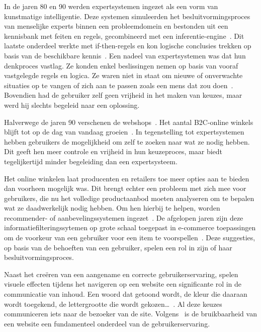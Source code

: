In de jaren 80 en 90 werden expertsystemen ingezet als een vorm van kunstmatige intelligentie. Deze systemen simuleerden het besluitvormingsproces van menselijke experts binnen een probleemdomein en bestonden uit een kennisbank met feiten en regels, gecombineerd met een inferentie-engine~\autocite{Angeli2010,Castillo2012}. Dit laatste onderdeel werkte met if-then-regels en kon logische conclusies trekken op basis van de beschikbare kennis~\autocite{Buchanan1988}. Een nadeel van expertsystemen was dat hun denkproces vastlag. Ze konden enkel beslissingen nemen op basis van vooraf vastgelegde regels en logica. Ze waren niet in staat om nieuwe of onverwachte situaties op te vangen of zich aan te passen zoals een mens dat zou doen~\autocite{Castillo2012}. Bovendien had de gebruiker zelf geen vrijheid in het maken van keuzes, maar werd hij slechts begeleid naar een oplossing.\par
\medskip
Halverwege de jaren 90 verschenen de webshops~\autocite{Chu2007}. Het aantal B2C-online winkels blijft tot op de dag van vandaag groeien~\autocite{Pokki2016}. In tegenstelling tot expertsystemen hebben gebruikers de mogelijkheid om zelf te zoeken naar wat ze nodig hebben. Dit geeft hen meer controle en vrijheid in hun keuzeproces, maar biedt tegelijkertijd minder begeleiding dan een expertsysteem.\par
\medskip
Het online winkelen laat producenten en retailers toe meer opties aan te bieden dan voorheen mogelijk was. Dit brengt echter een probleem met zich mee voor gebruikers, die nu het volledige productaanbod moeten analyseren om te bepalen wat ze daadwerkelijk nodig hebben. Om hen hierbij te helpen, worden recom\-mender- of aanbevelingssystemen ingezet~\autocite{Sivapalan2014}. De afgelopen jaren zijn deze informatiefilteringssytemen op grote schaal toegepast in e-com\-merce toepassingen om de voorkeur van een gebruiker voor een item te voorspellen~\autocite{Thorat2015}. Deze suggesties, op basis van de behoeften van een gebruiker, spelen een rol in zijn of haar besluitvormingsproces.\par

Naast het creëren van een aangename en correcte gebruikerservaring, spelen visuele effecten tijdens het navigeren op een website een significante rol in de communicatie van inhoud. Een woord dat getoond wordt, de kleur die daaraan wordt toegekend, de lettergrootte die wordt gekozen…~\autocite{Bordbar2016}. Al deze keuzes communiceren iets naar de bezoeker van de site. Volgens~\textcite{Lee2012} is de bruikbaarheid van een website een fundamenteel onderdeel van de gebruikerservaring.

